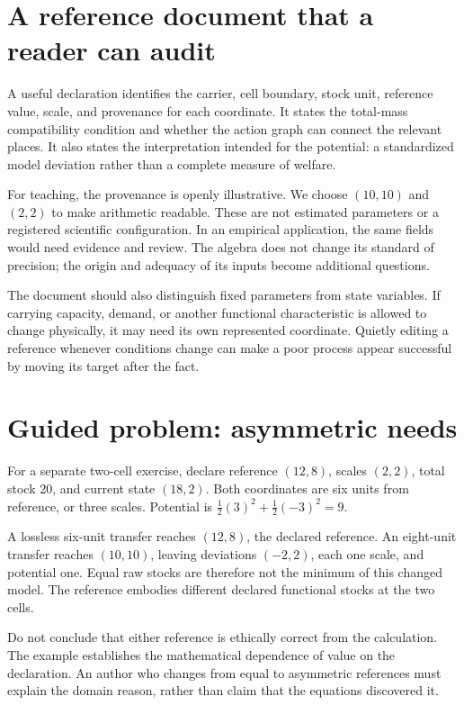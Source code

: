 \section{A reference document that a reader can audit}
A useful declaration identifies the carrier, cell boundary, stock unit, reference value, scale, and provenance for each coordinate. It states the total-mass compatibility condition and whether the action graph can connect the relevant places. It also states the interpretation intended for the potential: a standardized model deviation rather than a complete measure of welfare.

For teaching, the provenance is openly illustrative. We choose \((10,10)\) and \((2,2)\) to make arithmetic readable. These are not estimated parameters or a registered scientific configuration. In an empirical application, the same fields would need evidence and review. The algebra does not change its standard of precision; the origin and adequacy of its inputs become additional questions.

The document should also distinguish fixed parameters from state variables. If carrying capacity, demand, or another functional characteristic is allowed to change physically, it may need its own represented coordinate. Quietly editing a reference whenever conditions change can make a poor process appear successful by moving its target after the fact.

\section{Guided problem: asymmetric needs}
For a separate two-cell exercise, declare reference \((12,8)\), scales \((2,2)\), total stock 20, and current state \((18,2)\). Both coordinates are six units from reference, or three scales. Potential is \(\tfrac12(3)^2+\tfrac12(-3)^2=9\).

A lossless six-unit transfer reaches \((12,8)\), the declared reference. An eight-unit transfer reaches \((10,10)\), leaving deviations \((-2,2)\), each one scale, and potential one. Equal raw stocks are therefore not the minimum of this changed model. The reference embodies different declared functional stocks at the two cells.

Do not conclude that either reference is ethically correct from the calculation. The example establishes the mathematical dependence of value on the declaration. An author who changes from equal to asymmetric references must explain the domain reason, rather than claim that the equations discovered it.

